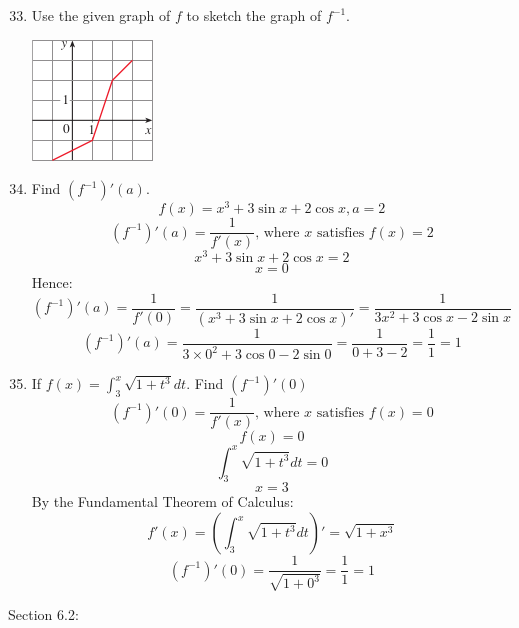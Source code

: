 \documentclass[12pt]{article}
\begin{document}
\begin{enumerate}
\setcounter{enumi}{32}
    \item Use the given graph of $f$ to sketch the graph of $f^{-1}$.
    \begin{center}
        \includegraphics{img/img-1.png}
    \end{center}

\setcounter{enumi}{41}
    \item Find $(f^{-1})'(a)$.
    \[f(x) = x^3 + 3\sin x + 2 \cos x, a = 2\]
    \[(f^{-1})'(a) = \frac{1}{f'(x)}\text{, where } x \text{ satisfies } f(x) = 2\]
    \[x^3 + 3\sin x + 2 \cos x = 2\]
    \[x = 0\]
    Hence:
    \[(f^{-1})'(a) = \frac{1}{f'(0)} = \frac{1}{(x^3 + 3\sin x + 2\cos x)'} = \frac{1}{3x^2 + 3\cos x - 2\sin x}\]
    \[(f^{-1})'(a) = \frac{1}{3 \times 0^2 + 3\cos 0 - 2\sin 0} = \frac{1}{0 + 3 - 2} = \frac{1}{1} = 1\]

\setcounter{enumi}{46}
    \item If $f(x) = \int^x_3 \sqrt{1+t^3}dt$. Find $(f^{-1})'(0)$
    \[(f^{-1})'(0) = \frac{1}{f'(x)} \text{, where } x \text{ satisfies } f(x) = 0\]
    \[f(x) = 0\]
    \[\int^x_3 \sqrt{1+t^3}dt = 0\]
    \[x = 3\]
    By the Fundamental Theorem of Calculus:
    \[f'(x) = (\int^x_3 \sqrt{1+t^3}dt)' = \sqrt{1+x^3}\]
    \[(f^{-1})'(0) = \frac{1}{\sqrt{1 + 0^3}} = \frac{1}{1} = 1\]

\end{enumerate}

Section 6.2:
\end{document}
